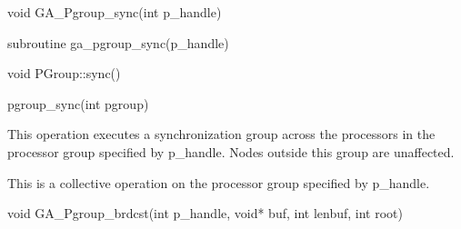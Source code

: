 \documentclass[12pt]{article}
\begin{document}

\begin{capi}
\begin{ccode}
void GA_Pgroup_sync(int p_handle)
\end{ccode}
\begin{funcargs}
\end{funcargs}
\end{capi}

\begin{fapi}
\begin{fcode}
subroutine ga_pgroup_sync(p_handle)
\end{fcode}
\begin{funcargs}
\end{funcargs}
\end{fapi}

\begin{cxxapi}
\begin{cxxcode}
void PGroup::sync()
\end{cxxcode}
\end{cxxapi}

\begin{pyapi}
\begin{pycode}
pgroup_sync(int pgroup) 
\end{pycode}
\end{pyapi} 

\gcoll
\begin{desc}

This operation executes a synchronization group across the processors in the processor group specified by p_handle. Nodes outside this group are unaffected.

This is a collective operation on the processor group specified by p_handle. 
\end{desc}


\begin{capi}
\begin{ccode}
void GA_Pgroup_brdcst(int p_handle, void* buf, int lenbuf, int root)
\end{ccode}
\begin{funcargs}
\end{funcargs}
\end{capi}
\end{document}
